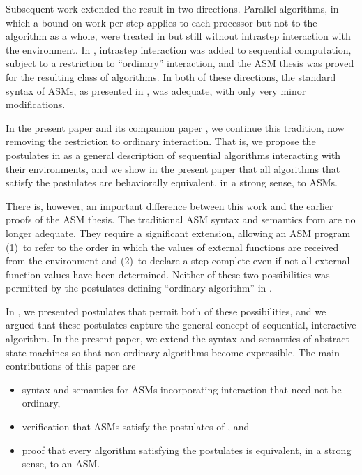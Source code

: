\documentclass{LMCS}
\theoremstyle{definition}
\newenvironment{ls}{\begin{itemize}}{\end{itemize}}
\begin{document}
Subsequent work extended the result in two directions.  Parallel
algorithms, in which a bound on work per step applies to each
processor but not to the algorithm as a whole, were treated in
\cite{parth} but still without intrastep interaction with the
environment.  In \cite{oa1, oa2, oa3}, intrastep interaction was added
to sequential computation, subject to a restriction to ``ordinary''
interaction, and the ASM thesis was proved for the resulting class of
algorithms.  In both of these directions, the standard syntax of ASMs,
as presented in \cite{G103}, was adequate, with only very minor
modifications.

In the present paper and its companion paper \cite{ga1}, we continue
this tradition, now removing the restriction to ordinary interaction.
That is, we propose the postulates in \cite{ga1} as a general
description of sequential algorithms interacting with their
environments, and we show in the present paper that all algorithms
that satisfy the postulates are behaviorally equivalent, in a strong
sense, to ASMs.

There is, however, an important difference between this work and the
earlier proofs of the ASM thesis.  The traditional ASM syntax and
semantics from \cite{G103} are no longer adequate.  They require a
significant extension, allowing an ASM program (1)~to refer to the
order in which the values of external functions are received from the
environment and (2)~to declare a step complete even if not all
external function values have been determined.  Neither of these two
possibilities was permitted by the postulates defining ``ordinary
algorithm'' in \cite{oa1}.  

In \cite{ga1}, we presented postulates that permit both of these
possibilities, and we argued that these postulates capture the general
concept of sequential, interactive algorithm.  In the present paper,
we extend the syntax and semantics of abstract state machines so that
non-ordinary algorithms become expressible.  The main contributions of
this paper are
\begin{ls}
\item syntax and semantics for ASMs incorporating interaction that need
  not be ordinary,
\item verification that ASMs satisfy the postulates of \cite{ga1}, and
\item proof that every algorithm satisfying the postulates is equivalent,
  in a strong sense, to an ASM.
\end{ls}
\end{document}
